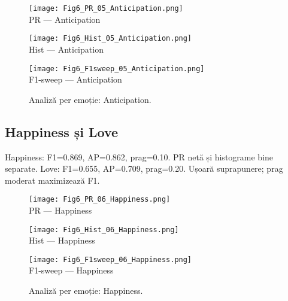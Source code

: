 \begin{figure}[H]
  \centering
  \begin{minipage}[t]{0.32\textwidth}\centering
    \texttt{[image: Fig6\_PR\_05\_Anticipation.png]}\\[-1mm]
    {\scriptsize PR — Anticipation}
  \end{minipage}\hfill
  \begin{minipage}[t]{0.32\textwidth}\centering
    \texttt{[image: Fig6\_Hist\_05\_Anticipation.png]}\\[-1mm]
    {\scriptsize Hist — Anticipation}
  \end{minipage}\hfill
  \begin{minipage}[t]{0.32\textwidth}\centering
    \texttt{[image: Fig6\_F1sweep\_05\_Anticipation.png]}\\[-1mm]
    {\scriptsize F1-sweep — Anticipation}
  \end{minipage}
  \caption{Analiză per emoție: Anticipation.}
  \label{fig:c6-anticipation}
\end{figure}

\subsection{Happiness și Love}
\noindent Happiness: F1=0.869, AP=0.862, prag=0.10. PR netă și histograme bine separate.
\noindent Love: F1=0.655, AP=0.709, prag=0.20. Ușoară suprapunere; prag moderat maximizează F1.

\begin{figure}[H]
  \centering
  \begin{minipage}[t]{0.32\textwidth}\centering
    \texttt{[image: Fig6\_PR\_06\_Happiness.png]}\\[-1mm]
    {\scriptsize PR — Happiness}
  \end{minipage}\hfill
  \begin{minipage}[t]{0.32\textwidth}\centering
    \texttt{[image: Fig6\_Hist\_06\_Happiness.png]}\\[-1mm]
    {\scriptsize Hist — Happiness}
  \end{minipage}\hfill
  \begin{minipage}[t]{0.32\textwidth}\centering
    \texttt{[image: Fig6\_F1sweep\_06\_Happiness.png]}\\[-1mm]
    {\scriptsize F1-sweep — Happiness}
  \end{minipage}
  \caption{Analiză per emoție: Happiness.}
  \label{fig:c6-happiness}
\end{figure}

